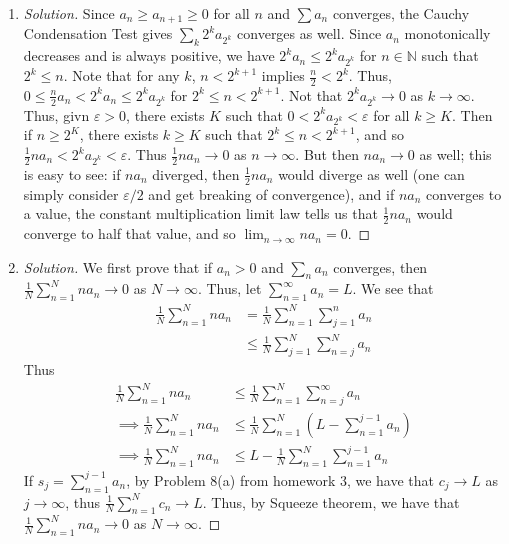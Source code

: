 \documentclass{article}
\newcommand{\N}{{\mathbb N}}
\newcommand{\ep}{{\varepsilon}}
\begin{document}
{{\begin{enumerate}
	\item \begin{proof}[Solution]\let\qed\relax
		Since $a_n \geq a_{n+1} \geq 0$ for all $n$
		and $\sum a_n$ converges,
		the Cauchy Condensation Test gives $\sum_k 2^k a_{2^k}$ converges as well.
		Since $a_n$ monotonically decreases and is always positive,
		we have $2^k a_n \leq 2^ka_{2^k}$ for $n \in \N$ such that $2^{k} \leq n$.
		Note that for any $k$, $n < 2^{k+1}$ implies $\frac{n}{2} < 2^k$.
		Thus, $0 \leq \frac{n}{2}a_n < 2^ka_{n} \leq 2^k a_{2^k}$
		for $2^{k} \leq n < 2^{k+1}$.
		Not that $2^ka_{2^k} \to 0$ as $k \to \infty$.
		Thus, givn $\ep > 0$,
		there exists $K$ such that $0 < 2^ka_{2^k} < \ep$ for all $k \geq K$.
		Then if $n \geq 2^K$, there exists $k \geq K$
		such that $2^k \leq n < 2^{k+1}$,
		and so $\frac12 na_n < 2^ka_{2^k} < \ep$.
		Thus $\frac12 na_n \to 0$ as $n \to \infty$.
		But then $na_n \to 0$ as well;
		this is easy to see: if $na_n$ diverged,
		then $\frac12n a_n$ would diverge as well
		(one can simply consider $\ep/2$ and get breaking of convergence),
		and if $na_n$ converges to a value,
		the constant multiplication limit law tells us that $\frac12na_n$
		would converge to half that value,
		and so $\lim_{n\to\infty} na_n = 0$.
	\end{proof}
	\item \begin{proof}[Solution]\let\qed\relax
		We first prove that if $a_n > 0$ and $\sum_n a_n$ converges,
		then $\frac{1}{N}\sum_{n=1}^N na_n \to 0$ as $N \to \infty$.
		Thus, let $\sum_{n=1}^\infty a_n = L$.
		We see that
		\begin{align*}
			\frac{1}{N}\sum_{n=1}^Nna_n
			&= \frac{1}{N}\sum_{n=1}^N\sum_{j=1}^n a_n\\
			&\leq \frac{1}{N}\sum_{j=1}^N\sum_{n=j}^N a_n
		\end{align*}
		Thus
		\begin{align*}
			\frac{1}{N}\sum_{n=1}^Nna_n
			&\leq \frac{1}{N} \sum_{n=1}^N\sum_{n=j}^\infty a_n\\
			\implies \frac{1}{N}\sum_{n=1}^Nna_n
			& \leq \frac{1}{N} \sum_{n=1}^N \left(L - \sum_{n=1}^{j-1}a_n\right)\\
			\implies \frac{1}{N}\sum_{n=1}^Nna_n
			& \leq L - \frac{1}{N}\sum_{n=1}^N \sum_{n=1}^{j-1}a_n
		\end{align*}
		If $s_j = \sum_{n=1}^{j-1} a_n$,
		by Problem 8(a) from homework 3,
		we have that $c_j \to L$ as $j \to \infty$,
		thus $\frac{1}{N}\sum_{n=1}^Nc_n \to L$.
		Thus, by Squeeze theorem, we have that $\frac{1}{N}\sum_{n=1}^Nna_n \to 0$
		as $N \to \infty$.


\end{proof}
\end{enumerate}}}
\end{document}
